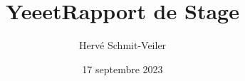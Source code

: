 \documentclass{report}
\title{Yeeet}
\title{\Huge{Rapport de Stage}}
\author{Hervé Schmit-Veiler}
\date{17 septembre 2023}
\begin{document}

%

\tableofcontents

\begingroup

\endgroup

\begingroup
\let\clearpage\relax

\endgroup

\begingroup
\let\clearpage\relax

\endgroup

\begingroup
\let\clearpage\relax

\endgroup

\begingroup
\let\clearpage\relax

\endgroup

\begingroup
\let\clearpage\relax

\endgroup

\printbibliography
\end{document}
